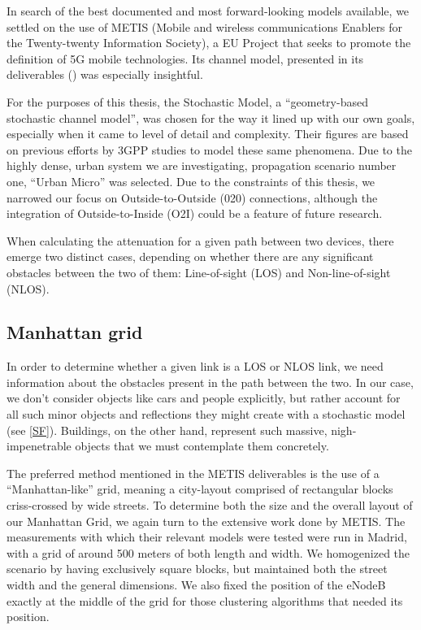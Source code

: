 In search of the best documented and most forward-looking models available, we settled on the use of METIS (Mobile and wireless communications Enablers for the Twenty-twenty Information Society), a EU Project that seeks to promote the definition of 5G mobile technologies. Its channel model, presented in its deliverables (\cite{Raschkowski}) was especially insightful. 

For the purposes of this thesis, the Stochastic Model, a ``geometry-based stochastic channel model'', was chosen for the way it lined up with our own goals, especially when it came to level of detail and complexity. Their figures are based on previous efforts by 3GPP studies to model these same phenomena. Due to the highly dense, urban system we are investigating, propagation scenario number one, ``Urban Micro'' was selected. Due to the constraints of this thesis, we narrowed our focus on Outside-to-Outside (020) connections, although the integration of Outside-to-Inside (O2I) could be a feature of future research.

When calculating the attenuation for a given path between two devices, there emerge two distinct cases, depending on whether there are any significant obstacles between the two of them: Line-of-sight (LOS) and Non-line-of-sight (NLOS).



\subsection{Manhattan grid} \label{mh_grid}
In order to determine whether a given link is a LOS or NLOS link, we need information about the obstacles present in the path between the two. In our case, we don't consider objects like cars and people explicitly, but rather account for all such minor objects and reflections they might create with a stochastic model (see \ref{SF}). Buildings, on the other hand, represent such massive, nigh-impenetrable objects that we must contemplate them concretely.

The preferred method mentioned in the METIS deliverables is the use of a ``Manhattan-like'' grid, meaning a city-layout comprised of rectangular blocks criss-crossed by wide streets. To determine both the size and the overall layout of our Manhattan Grid, we again turn to the extensive work done by METIS. The measurements with which their relevant models were tested were run in Madrid, with a grid of around 500 meters of both length and width. We homogenized the scenario by having exclusively square blocks, but maintained both the street width and the general dimensions. We also fixed the position of the eNodeB exactly at the middle of the grid for those clustering algorithms that needed its position.


